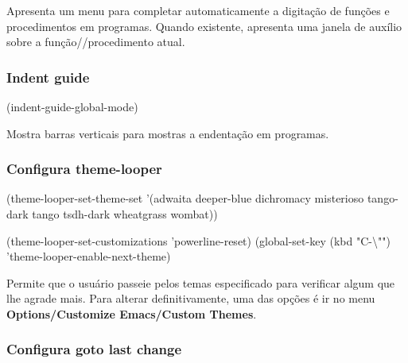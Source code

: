 \documentclass[]{article}
\newenvironment{Shaded}{}{}
\newcommand{\StringTok}[1]{\textcolor[rgb]{0.25,0.44,0.63}{{#1}}}
\newcommand{\NormalTok}[1]{{#1}}
\begin{document}
Apresenta um menu para completar automaticamente a digitação de funções
e procedimentos em programas. Quando existente, apresenta uma janela de
auxílio sobre a função//procedimento atual.

\subsubsection{Indent guide}\label{indent-guide}

\begin{Shaded}
\begin{Highlighting}[]
\NormalTok{(indent-guide-global-mode)}
\end{Highlighting}
\end{Shaded}

Mostra barras verticais para mostras a endentação em programas.

\subsubsection{Configura theme-looper}\label{configura-theme-looper}

\begin{Shaded}
\begin{Highlighting}[]
\NormalTok{(theme-looper-set-theme-set '(adwaita}
                              \NormalTok{deeper-blue}
                              \NormalTok{dichromacy}
                              \NormalTok{misterioso}
                              \NormalTok{tango-dark}
                  \NormalTok{tango}
                  \NormalTok{tsdh-dark}
                              \NormalTok{wheatgrass}
                              \NormalTok{wombat))}

\NormalTok{(theme-looper-set-customizations 'powerline-reset)}
\NormalTok{(global-set-key (kbd }\StringTok{"C-}\NormalTok{\textbackslash{}"}\StringTok{"}\NormalTok{) 'theme-looper-enable-next-theme)}
\end{Highlighting}
\end{Shaded}

Permite que o usuário passeie pelos temas especificado para verificar
algum que lhe agrade mais. Para alterar definitivamente, uma das opções
é ir no menu \textbf{Options/Customize Emacs/Custom Themes}.

\subsubsection{Configura goto last
change}\label{configura-goto-last-change}
\end{document}
